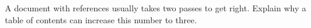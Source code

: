 A document with references usually takes two passes to get
  right. Explain why a table of contents can increase this number to
  three.
